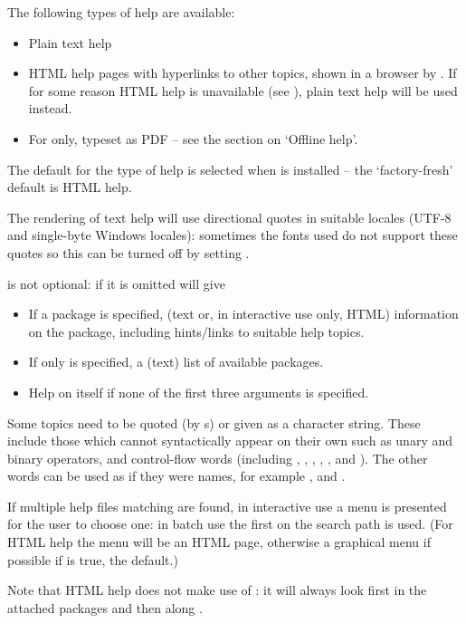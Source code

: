 %
\begin{Details}\relax
The following types of help are available:
\begin{itemize}

\item Plain text help
\item HTML help pages with hyperlinks to other topics, shown in a
browser by .
If for some reason HTML help is unavailable (see
), plain text help will be used
instead.
\item For  only, typeset as PDF --
see the section on `Offline help'.

\end{itemize}

The default for the type of help is selected when \R{} is installed --
the `factory-fresh' default is HTML help.

The rendering of text help will use directional quotes in suitable
locales (UTF-8 and single-byte Windows locales): sometimes the fonts
used do not support these quotes so this can be turned off by setting
.

 is not optional: if it is omitted \R{} will give
\begin{itemize}

\item If a package is specified, (text or, in interactive use only,
HTML) information on the package, including hints/links to suitable
help topics.
\item If  only is specified, a (text) list of available
packages.
\item Help on  itself if none of the first three
arguments is specified.

\end{itemize}


Some topics need to be quoted (by s) or given as a
character string.  These include those which cannot syntactically
appear on their own such as unary and binary operators,
 and control-flow  words (including
,  , , ,
,  and ).  The other 
words can be used as if they were names, for example ,
 and .

If multiple help files matching  are found, in interactive
use a menu is presented for the user to choose one: in batch use the
first on the search path is used.  (For HTML help the menu will be an
HTML page, otherwise a graphical menu if possible if
 is true, the default.)

Note that HTML help does not make use of : it will
always look first in the attached packages and then along
.
\end{Details}
